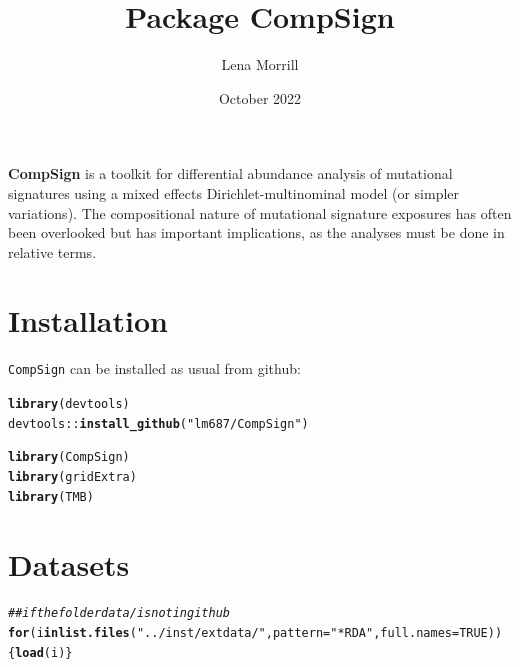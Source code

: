 \documentclass{article}\usepackage[]{graphicx}\usepackage[]{xcolor}
\title{Package \textbf{CompSign}}
\author{Lena Morrill}
\date{October 2022}
\makeatletter
\newcommand{\hlnum}[1]{\textcolor[rgb]{0.686,0.059,0.569}{#1}}%
\newcommand{\hlstr}[1]{\textcolor[rgb]{0.192,0.494,0.8}{#1}}%
\newcommand{\hlcom}[1]{\textcolor[rgb]{0.678,0.584,0.686}{\textit{#1}}}%
\newcommand{\hlopt}[1]{\textcolor[rgb]{0,0,0}{#1}}%
\newcommand{\hlstd}[1]{\textcolor[rgb]{0.345,0.345,0.345}{#1}}%
\newcommand{\hlkwa}[1]{\textcolor[rgb]{0.161,0.373,0.58}{\textbf{#1}}}%
\newcommand{\hlkwc}[1]{\textcolor[rgb]{0.333,0.667,0.333}{#1}}%
\newcommand{\hlkwd}[1]{\textcolor[rgb]{0.737,0.353,0.396}{\textbf{#1}}}%
\newenvironment{kframe}{%
 \def\at@end@of@kframe{}%
 \ifinner\ifhmode%
  \def\at@end@of@kframe{\end{minipage}}%
  \begin{minipage}{\columnwidth}%
 \fi\fi%
 \def\FrameCommand##1{\hskip\@totalleftmargin \hskip-\fboxsep
 \colorbox{shadecolor}{##1}\hskip-\fboxsep
     \hskip-\linewidth \hskip-\@totalleftmargin \hskip\columnwidth}%
 \MakeFramed {\advance\hsize-\width
   \@totalleftmargin\z@ \linewidth\hsize
   \@setminipage}}%
 {\par\unskip\endMakeFramed%
 \at@end@of@kframe}
\newenvironment{knitrout}{}{} %
\makeatother
\begin{document}
\maketitle

\textbf{CompSign} is a toolkit for differential abundance analysis of mutational signatures using a mixed effects Dirichlet-multinominal model (or simpler variations). The compositional nature of mutational signature exposures has often been overlooked but has important implications, as the analyses must be done in relative terms.

\tableofcontents

\section{Installation}
\texttt{CompSign} can be installed as usual from github:

\begin{knitrout}
\color{fgcolor}\begin{kframe}
\begin{alltt}
\hlkwd{library}\hlstd{(devtools)}
\hlstd{devtools}\hlopt{::}\hlkwd{install_github}\hlstd{(}\hlstr{"lm687/CompSign"}\hlstd{)}
\end{alltt}
\end{kframe}
\end{knitrout}

\begin{knitrout}
\color{fgcolor}\begin{kframe}
\begin{alltt}
\hlkwd{library}\hlstd{(CompSign)}
\hlkwd{library}\hlstd{(gridExtra)}
\hlkwd{library}\hlstd{(TMB)}
\end{alltt}


{\ttfamily\noindent\color{warningcolor}{\#\# Warning: package 'TMB' was built under R version 4.0.5}}\end{kframe}
\end{knitrout}

\section{Datasets}
\begin{knitrout}
\color{fgcolor}\begin{kframe}
\begin{alltt}
\hlcom{## if the folder data/ is not in github}
\hlkwa{for}\hlstd{(i} \hlkwa{in} \hlkwd{list.files}\hlstd{(}\hlstr{"../inst/extdata/"}\hlstd{,} \hlkwc{pattern} \hlstd{=} \hlstr{"*RDA"}\hlstd{,} \hlkwc{full.names} \hlstd{=} \hlnum{TRUE}\hlstd{))\{}\hlkwd{load}\hlstd{(i)\}}
\end{alltt}
\end{kframe}
\end{knitrout}
\end{document}
